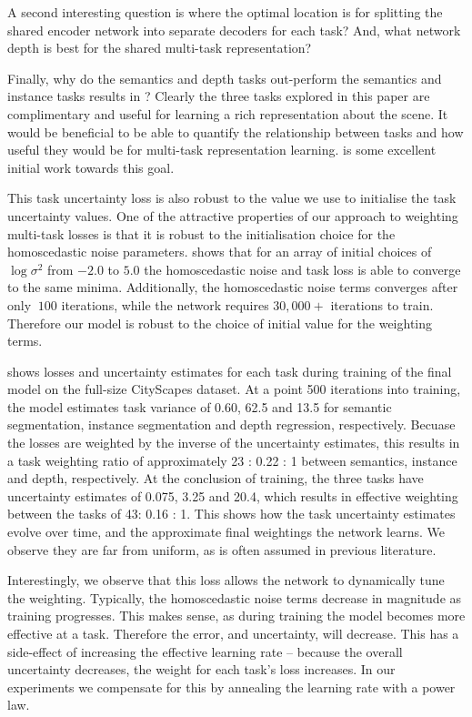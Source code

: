 A second interesting question is where the optimal location is for splitting the shared encoder network into separate decoders for each task? And, what network depth is best for the shared multi-task representation?

Finally, why do the semantics and depth tasks out-perform the semantics and instance tasks results in ? Clearly the three tasks explored in this paper are complimentary and useful for learning a rich representation about the scene. It would be beneficial to be able to quantify the relationship between tasks and how useful they would be for multi-task representation learning. \citep{zamir2018taskonomy} is some excellent initial work towards this goal.



This task uncertainty loss is also robust to the value we use to initialise the task uncertainty values.
One of the attractive properties of our approach to weighting multi-task losses is that it is robust to the initialisation choice for the homoscedastic noise parameters.  shows that for an array of initial choices of $\log \sigma^2$ from $-2.0$ to $5.0$ the homoscedastic noise and task loss is able to converge to the same minima. Additionally, the homoscedastic noise terms converges after only $~100$ iterations, while the network requires $30,000+$ iterations to train. Therefore our model is robust to the choice of initial value for the weighting terms.

 shows losses and uncertainty estimates for each task during training of the final model on the full-size CityScapes dataset. At a point 500 iterations into training, the model estimates task variance of 0.60, 62.5 and 13.5 for semantic segmentation, instance segmentation and depth regression, respectively. Becuase the losses are weighted by the inverse of the uncertainty estimates, this results in a task weighting ratio of approximately 23 : 0.22 : 1 between semantics, instance and depth, respectively. At the conclusion of training, the three tasks have uncertainty estimates of 0.075, 3.25 and 20.4, which results in effective weighting between the tasks of 43: 0.16 : 1. This shows how the task uncertainty estimates evolve over time, and the approximate final weightings the network learns. We observe they are far from uniform, as is often assumed in previous literature.

Interestingly, we observe that this loss allows the network to dynamically tune the weighting. Typically, the homoscedastic noise terms decrease in magnitude as training progresses. This makes sense, as during training the model becomes more effective at a task. Therefore the error, and uncertainty, will decrease. This has a side-effect of increasing the effective learning rate -- because the overall uncertainty decreases, the weight for each task's loss increases. In our experiments we compensate for this by annealing the learning rate with a power law.

